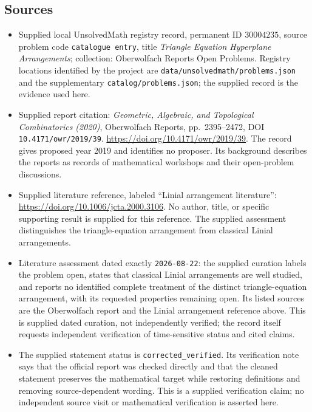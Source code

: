 \documentclass[11pt]{article}
\begin{document}
\subsection{Sources}
\begin{itemize}
\item Supplied local UnsolvedMath registry record, permanent ID \(30004235\), source problem code \texttt{catalogue entry}, title \emph{Triangle Equation Hyperplane Arrangements}; collection: Oberwolfach Reports Open Problems. Registry locations identified by the project are \texttt{data/unsolvedmath/problems.json} and the supplementary \texttt{catalog/problems.json}; the supplied record is the evidence used here.
\item Supplied report citation: \emph{Geometric, Algebraic, and Topological Combinatorics (2020)}, Oberwolfach Reports, pp.~2395--2472, DOI \texttt{10.4171/owr/2019/39}. \url{https://doi.org/10.4171/owr/2019/39}. The record gives proposed year 2019 and identifies no proposer. Its background describes the reports as records of mathematical workshops and their open-problem discussions.
\item Supplied literature reference, labeled ``Linial arrangement literature'': \url{https://doi.org/10.1006/jcta.2000.3106}. No author, title, or specific supporting result is supplied for this reference. The supplied assessment distinguishes the triangle-equation arrangement from classical Linial arrangements.
\item Literature assessment dated exactly \texttt{2026-08-22}: the supplied curation labels the problem open, states that classical Linial arrangements are well studied, and reports no identified complete treatment of the distinct triangle-equation arrangement, with its requested properties remaining open. Its listed sources are the Oberwolfach report and the Linial arrangement reference above. This is supplied dated curation, not independently verified; the record itself requests independent verification of time-sensitive status and cited claims.
\item The supplied statement status is \texttt{corrected\_verified}. Its verification note says that the official report was checked directly and that the cleaned statement preserves the mathematical target while restoring definitions and removing source-dependent wording. This is a supplied verification claim; no independent source visit or mathematical verification is asserted here.
\end{itemize}
\end{document}
